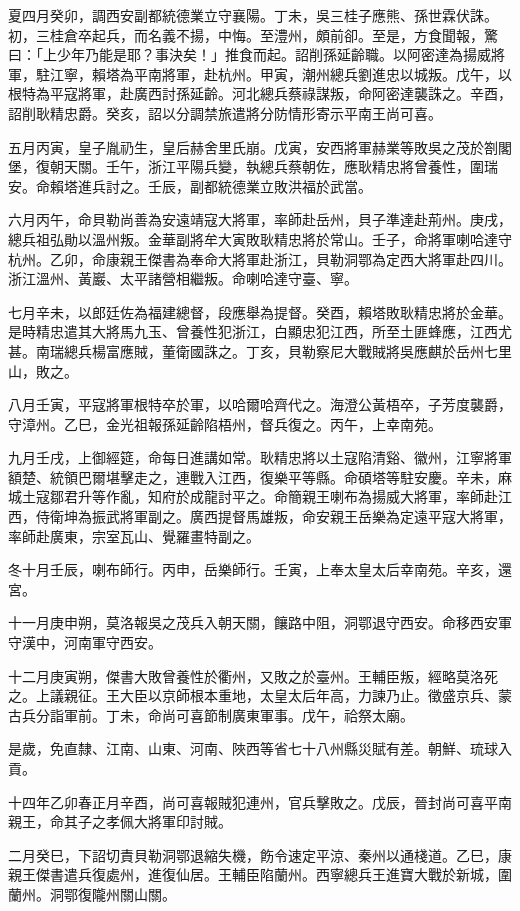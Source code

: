 \begin{pinyinscope}
夏四月癸卯，調西安副都統德業立守襄陽。丁未，吳三桂子應熊、孫世霖伏誅。初，三桂倉卒起兵，而名義不揚，中悔。至澧州，頗前卻。至是，方食聞報，驚曰：「上少年乃能是耶？事決矣！」推食而起。詔削孫延齡職。以阿密達為揚威將軍，駐江寧，賴塔為平南將軍，赴杭州。甲寅，潮州總兵劉進忠以城叛。戊午，以根特為平寇將軍，赴廣西討孫延齡。河北總兵蔡祿謀叛，命阿密達襲誅之。辛酉，詔削耿精忠爵。癸亥，詔以分調禁旅遣將分防情形寄示平南王尚可喜。

五月丙寅，皇子胤礽生，皇后赫舍里氏崩。戊寅，安西將軍赫業等敗吳之茂於劄閣堡，復朝天關。壬午，浙江平陽兵變，執總兵蔡朝佐，應耿精忠將曾養性，圍瑞安。命賴塔進兵討之。壬辰，副都統德業立敗洪福於武當。

六月丙午，命貝勒尚善為安遠靖寇大將軍，率師赴岳州，貝子準達赴荊州。庚戌，總兵祖弘勛以溫州叛。金華副將牟大寅敗耿精忠將於常山。壬子，命將軍喇哈達守杭州。乙卯，命康親王傑書為奉命大將軍赴浙江，貝勒洞鄂為定西大將軍赴四川。浙江溫州、黃巖、太平諸營相繼叛。命喇哈達守臺、寧。

七月辛未，以郎廷佐為福建總督，段應舉為提督。癸酉，賴塔敗耿精忠將於金華。是時精忠遣其大將馬九玉、曾養性犯浙江，白顯忠犯江西，所至土匪蜂應，江西尤甚。南瑞總兵楊富應賊，董衛國誅之。丁亥，貝勒察尼大戰賊將吳應麒於岳州七里山，敗之。

八月壬寅，平寇將軍根特卒於軍，以哈爾哈齊代之。海澄公黃梧卒，子芳度襲爵，守漳州。乙巳，金光祖報孫延齡陷梧州，督兵復之。丙午，上幸南苑。

九月壬戌，上御經筵，命每日進講如常。耿精忠將以土寇陷清谿、徽州，江寧將軍額楚、統領巴爾堪擊走之，連戰入江西，復樂平等縣。命碩塔等駐安慶。辛未，麻城土寇鄒君升等作亂，知府於成龍討平之。命簡親王喇布為揚威大將軍，率師赴江西，侍衛坤為振武將軍副之。廣西提督馬雄叛，命安親王岳樂為定遠平寇大將軍，率師赴廣東，宗室瓦山、覺羅畫特副之。

冬十月壬辰，喇布師行。丙申，岳樂師行。壬寅，上奉太皇太后幸南苑。辛亥，還宮。

十一月庚申朔，莫洛報吳之茂兵入朝天關，饟路中阻，洞鄂退守西安。命移西安軍守漢中，河南軍守西安。

十二月庚寅朔，傑書大敗曾養性於衢州，又敗之於臺州。王輔臣叛，經略莫洛死之。上議親征。王大臣以京師根本重地，太皇太后年高，力諫乃止。徵盛京兵、蒙古兵分詣軍前。丁未，命尚可喜節制廣東軍事。戊午，祫祭太廟。

是歲，免直隸、江南、山東、河南、陜西等省七十八州縣災賦有差。朝鮮、琉球入貢。

十四年乙卯春正月辛酉，尚可喜報賊犯連州，官兵擊敗之。戊辰，晉封尚可喜平南親王，命其子之孝佩大將軍印討賊。

二月癸巳，下詔切責貝勒洞鄂退縮失機，飭令速定平涼、秦州以通棧道。乙巳，康親王傑書遣兵復處州，進復仙居。王輔臣陷蘭州。西寧總兵王進寶大戰於新城，圍蘭州。洞鄂復隴州關山關。


\end{pinyinscope}
